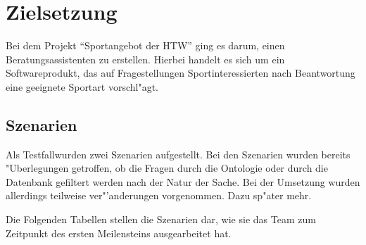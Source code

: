 \chapter{Zielsetzung}

Bei dem Projekt "`Sportangebot der HTW"' ging es darum, einen Beratungsassistenten zu erstellen. Hierbei handelt es sich um ein Softwareprodukt, das auf Fragestellungen Sportinteressierten nach Beantwortung eine geeignete Sportart vorschl"agt.

\section{Szenarien}

Als Testfallwurden zwei Szenarien aufgestellt. Bei den Szenarien wurden bereits "Uberlegungen getroffen, ob die Fragen durch die Ontologie oder durch die Datenbank gefiltert werden nach der Natur der Sache. Bei der Umsetzung wurden allerdings teilweise ver"'anderungen vorgenommen. Dazu sp"ater mehr.

Die Folgenden Tabellen stellen die Szenarien dar, wie sie das Team zum Zeitpunkt des ersten Meilensteins ausgearbeitet hat.

